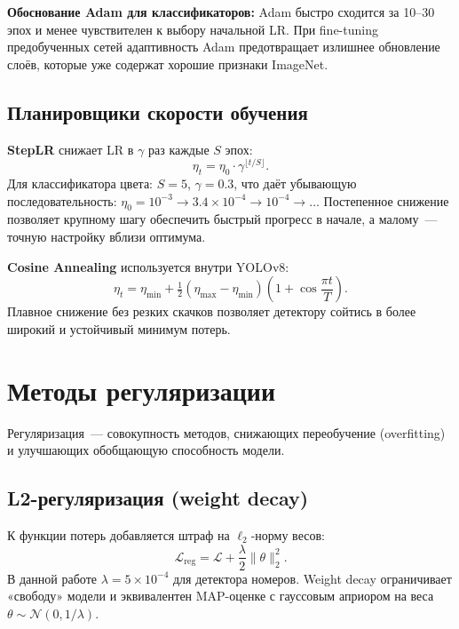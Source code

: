 \documentclass[14pt,a4paper]{report}
\numberwithin{equation}{chapter}
\numberwithin{figure}{chapter}
\numberwithin{table}{chapter}
\begin{document}
\textbf{Обоснование Adam для классификаторов:}
Adam быстро сходится за 10--30 эпох и менее чувствителен
к выбору начальной LR. При fine-tuning предобученных сетей
адаптивность Adam предотвращает излишнее обновление слоёв,
которые уже содержат хорошие признаки ImageNet.

\subsection{Планировщики скорости обучения}

\textbf{StepLR} снижает LR в $\gamma$ раз каждые $S$ эпох:
\begin{equation}
  \eta_t = \eta_0\cdot\gamma^{\lfloor t/S\rfloor}.
\end{equation}
Для классификатора цвета: $S=5$, $\gamma=0.3$, что даёт
убывающую последовательность: $\eta_0=10^{-3} \to
3.4\!\times\!10^{-4} \to 10^{-4} \to \ldots$ Постепенное снижение
позволяет крупному шагу обеспечить быстрый прогресс в начале,
а малому~--- точную настройку вблизи оптимума.

\textbf{Cosine Annealing} используется внутри YOLOv8:
\begin{equation}
  \eta_t = \eta_{\min} +
    \tfrac{1}{2}(\eta_{\max}-\eta_{\min})
    \!\left(1+\cos\frac{\pi t}{T}\right).
\end{equation}
Плавное снижение без резких скачков позволяет детектору
сойтись в более широкий и устойчивый минимум потерь.

\section{Методы регуляризации}

Регуляризация~--- совокупность методов, снижающих переобучение
(overfitting) и улучшающих обобщающую способность модели.

\subsection{L2-регуляризация (weight decay)}

К функции потерь добавляется штраф на $\ell_2$-норму весов:
\begin{equation}
  \mathcal{L}_{\mathrm{reg}} = \mathcal{L} +
    \frac{\lambda}{2}\|\theta\|_2^2.
\end{equation}
В данной работе $\lambda = 5\!\times\!10^{-4}$ для детектора
номеров. Weight decay ограничивает «свободу» модели и
эквивалентен MAP-оценке с гауссовым априором на веса
$\theta \sim \mathcal{N}(0, 1/\lambda)$.
\end{document}
